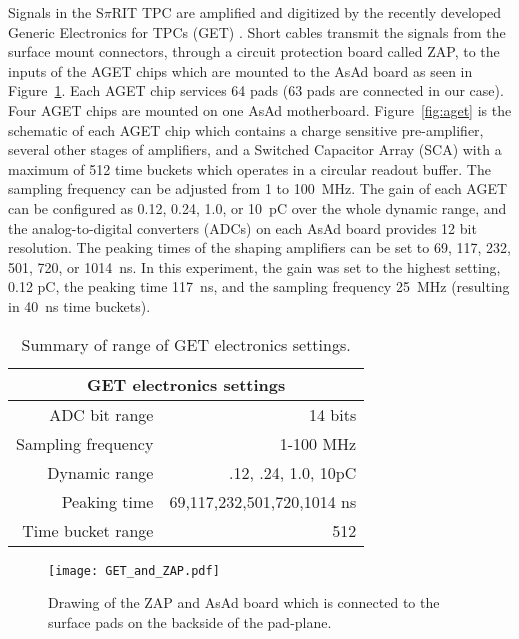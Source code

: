Signals in the S$\pi$RIT TPC are amplified and digitized by the recently developed Generic Electronics for TPCs (GET) \cite{get}.  Short cables transmit the signals from the surface mount connectors, through a circuit protection board called ZAP, to the inputs of the AGET chips which are mounted to the AsAd board as seen in Figure~\ref{fig:getzap}. Each AGET chip services 64 pads (63 pads are connected in our case). Four AGET chips are mounted on one AsAd  motherboard. Figure~\ref{fig:aget} is the schematic of each  AGET chip which contains a charge sensitive pre-amplifier, several other stages of amplifiers, and a Switched Capacitor Array (SCA) with a maximum of 512 time buckets which operates in a circular readout buffer. The sampling frequency can be adjusted from 1 to \SI{100}{\mega\hertz}. The gain of each AGET can be configured as 0.12, 0.24, 1.0, or \SI{10}{\pico\coulomb} over the whole dynamic range, and the analog-to-digital converters (ADCs) on each AsAd board provides 12 bit resolution. The peaking times of the shaping amplifiers can be set to 69, 117, 232, 501, 720, or \SI{1014}{\nano\second}. In this experiment, the gain was set to the highest setting, 0.12 \si{\pico\coulomb}, the peaking time \SI{117}{\nano\second}, and the sampling frequency \SI{25}{\mega\hertz} (resulting in \SI{40}{\nano\second} time buckets). 

\begin{table*}[!htb]
\centering
{}
\begin{tabular}{@{}rr@{}}\toprule 
\multicolumn{2}{c}{GET electronics settings}\\
\midrule
ADC bit range       & 14 bits \\
Sampling frequency  & 1-100 MHz \\
Dynamic range       & .12, .24, 1.0, 10pC \\
Peaking time        & 69,117,232,501,720,1014 ns \\
Time bucket range   & 512\\
\bottomrule
\end{tabular}
\caption{Summary of range of GET electronics settings. }
\label{tb:getoverview}
\end{table*}

\begin{figure}[!htb]
\centering
\texttt{[image: GET\_and\_ZAP.pdf]}
\caption{Drawing of the ZAP and AsAd board which is connected to the surface pads on the backside of the pad-plane.}
\label{fig:getzap}
\end{figure}



